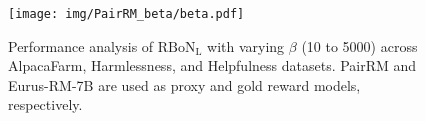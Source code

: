 \begin{figure}[htbp]
    \centering
    \texttt{[image: img/PairRM\_beta/beta.pdf]}
    \caption{Performance analysis of $\mathrm{RBoN}_{\mathrm{L}}$ with varying $\beta$ (10 to 5000) across AlpacaFarm, Harmlessness, and Helpfulness datasets. PairRM and Eurus-RM-7B are used as proxy and gold reward models, respectively.}
    \label{fig:pair_beta}
\end{figure}







